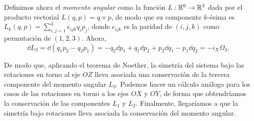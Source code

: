 \begin{ejemplo}
    Definimos ahora el \emph{momento angular} como la función $L:\mathbb{R}^6 \rightarrow \mathbb{R}^3$ dada por el producto vectorial $L(q,p)=q\times p$, de modo que su componente $k$-ésima es $L_k(q,p)=\sum_{i,j=1}^3 \epsilon_{ijk}q_ip_j$, donde $\epsilon_{ijk}$ es la paridad de $(i,j,k)$ como permutación de $(1,2,3)$. Ahora, 
    \begin{equation*}
      \dd L_3 = \dd (q_1p_2 - q_2p_1)=-q_2 \dd p_1 + q_1 \dd p_2 + p_2 \dd q_1 - p_1 \dd q_2 = -i_X\Omega_3.
    \end{equation*}

    De modo que, aplicando el teorema de Noether, la simetría del sistema bajo las rotaciones en torno al eje $OZ$ lleva asociada una conservación de la tercera componente del momento angular $L_3$. Podemos hacer un cálculo análogo para los casos de las rotaciones en torno a los ejes $OX$ y $OY$, de forma que obtendríamos la conservación de las componentes $L_1$ y $L_2$. Finalmente, llegaríamos a que la simetría bajo rotaciones lleva asociada la conservación del momento angular.
\end{ejemplo}
